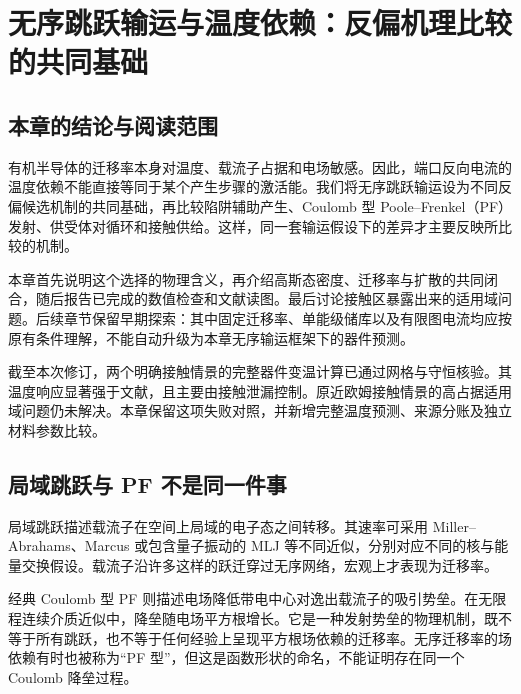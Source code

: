 \section{{\cjkfont 无序跳跃输运与温度依赖：反偏机理比较的共同基础}\allowbreak{}}\label{sec:transport-temperature}
\subsection{{\cjkfont 本章的结论与阅读范围}\allowbreak{}}
{\cjkfont 有机半导体的迁移率本身对温度、载流子占据和电场敏感。因此，端口反向电流的温度依赖不能直接等同于某个产生步骤的激活能。我们将无序跳跃输运设为不同反偏候选机制的共同基础，再比较陷阱辅助产生、}\allowbreak{}Coulomb {\cjkfont 型}\allowbreak{} Poole--Frenkel{\cjkfont （}\allowbreak{}PF{\cjkfont ）发射、供受体对循环和接触供给。这样，同一套输运假设下的差异才主要反映所比较的机制。}\allowbreak{}

{\cjkfont 本章首先说明这个选择的物理含义，再介绍高斯态密度、迁移率与扩散的共同闭合，随后报告已完成的数值检查和文献读图。最后讨论接触区暴露出来的适用域问题。后续章节保留早期探索：其中固定迁移率、单能级储库以及有限图电流均应按原有条件理解，不能自动升级为本章无序输运框架下的器件预测。}\allowbreak{}

{\cjkfont 截至本次修订，两个明确接触情景的完整器件变温计算已通过网格与守恒核验。其温度响应显著强于文献，且主要由接触泄漏控制。原近欧姆接触情景的高占据适用域问题仍未解决。本章保留这项失败对照，并新增完整温度预测、来源分账及独立材料参数比较。}\allowbreak{}

\subsection{{\cjkfont 局域跳跃与}\allowbreak{} PF {\cjkfont 不是同一件事}\allowbreak{}}
{\cjkfont 局域跳跃描述载流子在空间上局域的电子态之间转移。其速率可采用}\allowbreak{} Miller--Abrahams{\cjkfont 、}\allowbreak{}Marcus {\cjkfont 或包含量子振动的}\allowbreak{} MLJ {\cjkfont 等不同近似，分别对应不同的核与能量交换假设。载流子沿许多这样的跃迁穿过无序网络，宏观上才表现为迁移率。}\allowbreak{}

{\cjkfont 经典}\allowbreak{} Coulomb {\cjkfont 型}\allowbreak{} PF {\cjkfont 则描述电场降低带电中心对逸出载流子的吸引势垒。在无限程连续介质近似中，降垒随电场平方根增长。它是一种发射势垒的物理机制，既不等于所有跳跃，也不等于任何经验上呈现平方根场依赖的迁移率。无序迁移率的场依赖有时也被称为}\allowbreak{}“PF {\cjkfont 型}\allowbreak{}”{\cjkfont ，但这是函数形状的命名，不能证明存在同一个}\allowbreak{} Coulomb {\cjkfont 降垒过程。}\allowbreak{}

